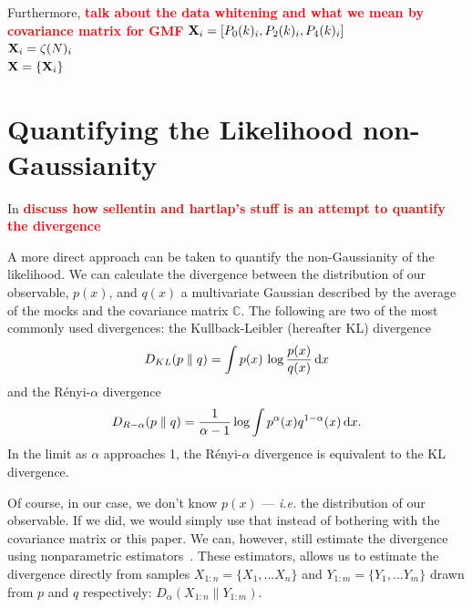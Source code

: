 \documentclass[12pt, letterpaper, preprint]{aastex}
\newcommand{\beq}{\begin{equation}}
\newcommand{\eeq}{\end{equation}}
\newcommand{\todo}[1]{{\bf \textcolor{red}{#1}}}
\begin{document}
Furthermore, 
\todo{talk about the data whitening and what we mean by covariance matrix for GMF} 
${\bf X}_i = [P_0(k)_i,P_2(k)_i,P_4(k)_i]$ \\
${\bf X}_i = \zeta(N)_i$ \\ 
${\bf X} = \{{\bf X}_i\}$

\section{Quantifying the Likelihood non-Gaussianity}
In \cite{sellentin2017} \todo{discuss how sellentin and hartlap's stuff is an attempt to quantify the divergence} 

A more direct approach can be taken to quantify the non-Gaussianity of 
the likelihood. We can calculate the divergence between the distribution 
of our observable, $p(x)$, and $q(x)$ a multivariate Gaussian described 
by the average of the mocks and the covariance matrix $\mathbb{C}$.
The following are two of the most commonly used divergences: 
the Kullback-Leibler (hereafter KL) divergence
\beq \label{eq:kl} 
D_{KL} ( p \parallel q ) = \int p(x)\,\log \frac{p(x)}{q(x)}\,{\rm d}x
\eeq
and the R\'enyi-$\alpha$ divergence
\beq \label{eq:renyi}
D_{R-\alpha} ( p \parallel q ) = \frac{1}{\alpha -1} \log \int p^\alpha(x) q^{1 -\alpha}(x)\,{\rm d}x. 
\eeq
In the limit as $\alpha$ approaches 1, the R\'enyi-$\alpha$ divergence is
equivalent to the KL divergence.

Of course, in our case, we don't know $p(x)$ --- \emph{i.e.} the distribution of
our observable. If we did, we would simply use that instead of bothering with 
the covariance matrix or this paper. We can, however, still estimate the 
divergence using nonparametric estimators~\citep{wang2009, poczos2012, krishnamurthy2014}. 
These estimators, allows us to estimate the divergence directly from 
samples $X_{1:n} = \{ X_1, ... X_n \}$ and $Y_{1:m} = \{ Y_1, ... Y_m \}$ 
drawn from $p$ and $q$ respectively: $\hat{D}_{\alpha}(X_{1:n} \parallel Y_{1:m})$. 
\end{document}
